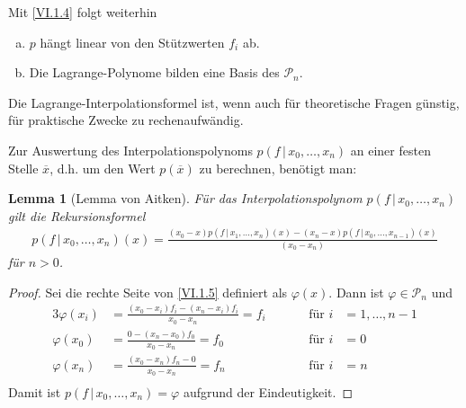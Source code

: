\documentclass[ngerman,fontsize=11pt, paper=a4, parskip=half, titlepage=true, toc=bib]{scrbook}
\theoremstyle{definition}
\theoremstyle{plain}
\newtheorem{Lem}[Def]{Lemma}		%
\newcommand{\subsectione}[1]{\subsection{#1} \addtocounter{Def}{1}}
\newenvironment{Leme}[1][]{ %
	\begin{Lem}[#1]
	}
	{
	\end{Lem}
	\addtocounter{subsection}{1}
}
\begin{document}
    Mit \eqref{VI.1.4} folgt weiterhin
    \begin{enumerate}[a)]
    \item $p$ hängt linear von den Stützwerten $f_i$ ab.
    \item Die Lagrange-Polynome bilden eine Basis des $\mathcal{P}_n$.
    \end{enumerate}

    Die Lagrange-Interpolationsformel ist,
    wenn auch für theoretische Fragen günstig,
    für praktische Zwecke zu rechenaufwändig.

    Zur Auswertung des Interpolationspolynoms $p(f\,|\,x_0,\dots, x_n)$
    an einer festen Stelle $\overline{x}$, d.h.
    um den Wert $p(\overline{x} ) $ zu berechnen,
    benötigt man:

    \begin{Leme}[Lemma von Aitken]
    Für das Interpolationspolynom $p(f\,|\,x_0, \dots, x_n)$ gilt die 
    Rekursionsformel
    \begin{gather}
    p(f\,|\,x_0, \dots, x_n) (x) = \frac{(x_0-x)p(f\,|\,x_1,\dots, x_n)(x) -
    	(x_n-x)p(f\,|\,x_0,\dots, x_{n-1})(x)}
    {(x_0-x_n)}
    \label{VI.1.5}
    \end{gather}
    für $n>0$.	
    \end{Leme}
    
    \begin{proof}
      Sei die rechte Seite von \eqref{VI.1.5} definiert als $\varphi(x)$.
      Dann ist $\varphi\in\mathcal{P}_n$ und 
      \begin{alignat*}{3}
        \varphi(x_i) &= \frac{(x_0-x_i)f_i-(x_n-x_i)f_i}{x_0-x_n}= f_i\quad
        &&&\text{für } i&=1,\dots , n-1\\
        \varphi(x_0) &= \frac{0-(x_n-x_0)f_0}{x_0-x_n} = f_0
        &&&\text{für } i&=0\\
        \varphi(x_n) &= \frac{(x_0-x_n)f_n-0}{x_0-x_n} = f_n
        &&&\text{für } i&=n\\
      \end{alignat*}
      Damit ist $p(f\,|\,x_0, \dots, x_n) = \varphi$ aufgrund der Eindeutigkeit.
    \end{proof}

    
    
    
    
    \nocite{*} %

    


    \printindex		%

    \printbibliography	%


  
\end{document}

